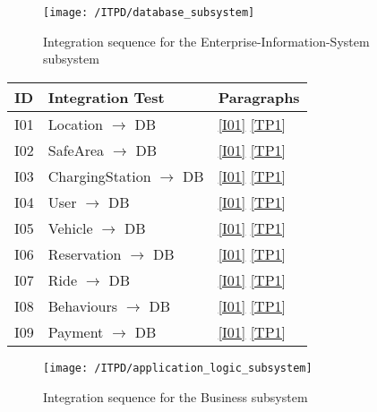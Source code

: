 	\begin{figure}[!ht]
	  \centering
	  \vspace{0.2cm}
	  \texttt{[image: /ITPD/database\_subsystem]}\\
	  \vspace{0.2cm}
	  \caption{Integration sequence for the Enterprise-Information-System subsystem} 
	  \label{fig:database_integration} 
	\end{figure}

	\begin{center}
		\vspace{0.6cm}
		\begin{tabular}{|l|l|l|}
			\hline
			\textbf{ID} & \textbf{Integration Test} & \textbf{Paragraphs} \bigstrut \\\hline
			\hline
			I01 & Location \ensuremath{\rightarrow} DB & \ref{I01}  \ref{TP1} \bigstrut \\\hline
			I02 & SafeArea \ensuremath{\rightarrow} DB & \ref{I01}  \ref{TP1} \bigstrut \\\hline
			I03 & ChargingStation \ensuremath{\rightarrow} DB & \ref{I01}  \ref{TP1} \bigstrut \\\hline
			I04 & User \ensuremath{\rightarrow} DB & \ref{I01}  \ref{TP1} \bigstrut \\\hline
			I05 & Vehicle \ensuremath{\rightarrow} DB & \ref{I01}  \ref{TP1} \bigstrut \\\hline
			I06 & Reservation \ensuremath{\rightarrow} DB & \ref{I01}  \ref{TP1} \bigstrut \\\hline
			I07 & Ride \ensuremath{\rightarrow} DB & \ref{I01}  \ref{TP1} \bigstrut \\\hline
			I08 & Behaviours \ensuremath{\rightarrow} DB & \ref{I01}  \ref{TP1} \bigstrut \\\hline
			I09 & Payment \ensuremath{\rightarrow} DB & \ref{I01}  \ref{TP1} \bigstrut \\\hline
		\end{tabular}
	\end{center}

	\newpage
	\begin{figure}[!ht]
	  \centering
	  \vspace{0.2cm}
	  \texttt{[image: /ITPD/application\_logic\_subsystem]}\\
	  \vspace{0.2cm}
	  \caption{Integration sequence for the Business subsystem} 
	  \label{fig:application_logic_subsystem} 
	\end{figure}

